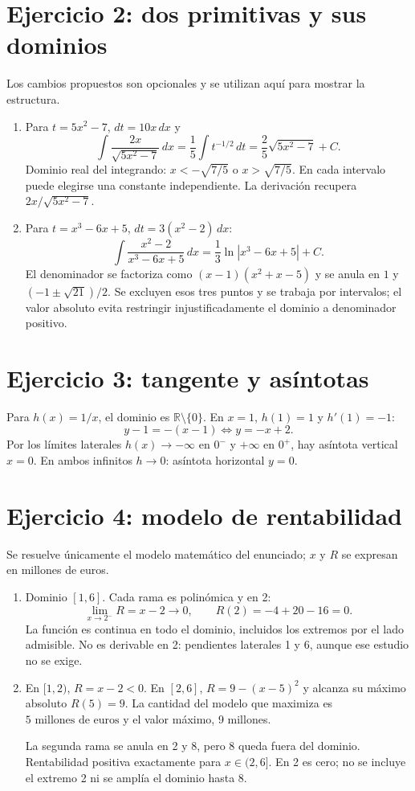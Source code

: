 \documentclass[11pt]{article}
\begin{document}
\section*{Ejercicio 2: dos primitivas y sus dominios}
Los cambios propuestos son opcionales y se utilizan aquí para mostrar la estructura.
\begin{enumerate}[label=(\alph*)]
\item Para $t=5x^2-7$, $dt=10x\,dx$ y
\[
\int\frac{2x}{\sqrt{5x^2-7}}\,dx=\frac15\int t^{-1/2}\,dt
=\boxed{\frac25\sqrt{5x^2-7}+C}.
\]
Dominio real del integrando: $x<-\sqrt{7/5}$ o $x>\sqrt{7/5}$. En cada intervalo puede elegirse una constante independiente. La derivación recupera $2x/\sqrt{5x^2-7}$.
\item Para $t=x^3-6x+5$, $dt=3(x^2-2)\,dx$:
\[
\int\frac{x^2-2}{x^3-6x+5}\,dx=\boxed{\frac13\ln|x^3-6x+5|+C}.
\]
El denominador se factoriza como $(x-1)(x^2+x-5)$ y se anula en $1$ y $(-1\pm\sqrt{21})/2$. Se excluyen esos tres puntos y se trabaja por intervalos; el valor absoluto evita restringir injustificadamente el dominio a denominador positivo.
\end{enumerate}
\clearpage
\section*{Ejercicio 3: tangente y asíntotas}
Para $h(x)=1/x$, el dominio es $\mathbb R\setminus\{0\}$. En $x=1$, $h(1)=1$ y $h'(1)=-1$:
\[
\boxed{y-1=-(x-1)\iff y=-x+2}.
\]
Por los límites laterales $h(x)\to-\infty$ en $0^-$ y $+\infty$ en $0^+$, hay asíntota vertical $\boxed{x=0}$. En ambos infinitos $h\to0$: asíntota horizontal $\boxed{y=0}$.
\clearpage
\section*{Ejercicio 4: modelo de rentabilidad}
Se resuelve únicamente el modelo matemático del enunciado; $x$ y $R$ se expresan en millones de euros.
\begin{enumerate}[label=(\alph*)]
\item Dominio $[1,6]$. Cada rama es polinómica y en 2:
\[
\lim_{x\to2^-}R=x-2\to0,\qquad R(2)=-4+20-16=0.
\]
La función es continua en todo el dominio, incluidos los extremos por el lado admisible. No es derivable en 2: pendientes laterales 1 y 6, aunque ese estudio no se exige.
\item En $[1,2)$, $R=x-2<0$. En $[2,6]$, $R=9-(x-5)^2$ y alcanza su máximo absoluto $\boxed{R(5)=9}$. La cantidad del modelo que maximiza es $\boxed{5\text{ millones de euros}}$ y el valor máximo, 9 millones.

La segunda rama se anula en 2 y 8, pero 8 queda fuera del dominio. Rentabilidad positiva exactamente para $\boxed{x\in(2,6]}$. En 2 es cero; no se incluye el extremo 2 ni se amplía el dominio hasta 8.
\end{enumerate}
\clearpage
\end{document}
